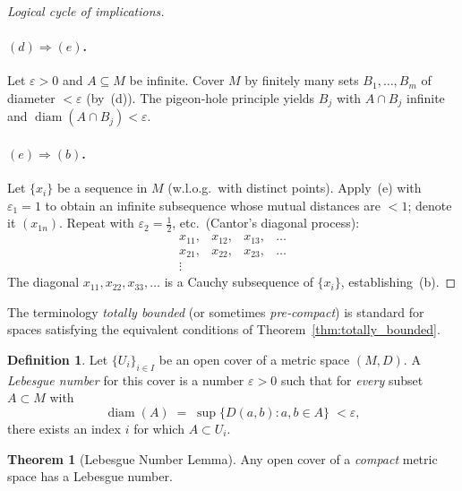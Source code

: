 \documentclass[12pt]{article}
\theoremstyle{definition} %
\newtheorem{theorem}{Theorem}
\newtheorem{definition}{Definition}
\theoremstyle{plain} %
\begin{document}
\begin{proof}[Logical cycle of implications]
  \paragraph{\textbf{$(d)\Longrightarrow(e)$}.}
      Let $\varepsilon>0$ and $A\subseteq M$ be infinite.
      Cover $M$ by finitely many sets $B_1,\dots,B_m$ of
      diameter $<\varepsilon$ (by (d)).
      The pigeon‑hole principle yields $B_j$ with $A\cap B_j$ infinite
      and $\operatorname{diam}(A\cap B_j)<\varepsilon$.

  \paragraph{\textbf{$(e)\Longrightarrow(b)$}.}
      Let $\{x_i\}$ be a sequence in $M$ (w.l.o.g.\ with distinct
      points).  
      Apply~(e) with $\varepsilon_1=1$ to obtain an infinite
      subsequence whose mutual distances are $<1$; denote it
      $(x_{1n})$.
      Repeat with $\varepsilon_2=\tfrac12$, etc.\ (Cantor’s diagonal
      process):
      \[
          \begin{array}{cccc}
             x_{11}, & x_{12}, & x_{13}, & \dots  \\
             x_{21}, & x_{22}, & x_{23}, & \dots  \\
             \vdots  &          &        &
          \end{array}
      \]
      The diagonal $x_{11},x_{22},x_{33},\dots$ is a Cauchy
      subsequence of $\{x_i\}$, establishing (b).
\end{proof}

\medskip\noindent
The terminology \emph{totally bounded} (or sometimes \emph{pre‑compact})
is standard for spaces satisfying the equivalent conditions of
Theorem \ref{thm:totally_bounded}.

\begin{definition}
  Let $\{U_i\}_{i\in I}$ be an open cover of a metric space $(M,D)$.  
  A \emph{Lebesgue number} for this cover is a number $\varepsilon>0$ such that for
  \emph{every} subset $A\subset M$ with 
  \[
  \operatorname{diam}(A)\;=\;\sup\{D(a,b):a,b\in A\}\;<\varepsilon,
  \]
  there exists an index $i$ for which $A\subset U_i$.
  \end{definition}
  
  \begin{theorem}[Lebesgue Number Lemma]\label{thm:lebesgue_number}
  Any open cover of a \emph{compact} metric space has a Lebesgue number.
  \end{theorem}
  
\end{document}
